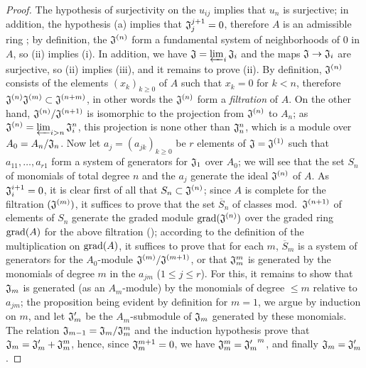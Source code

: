 \begin{proof}
\label{proof-0.7.2.7}
The hypothesis of surjectivity on the $u_{ij}$ implies that $u_n$ is surjective;
in addition, the hypothesis (a) implies that $\mathfrak{J}_j^{j+1}=0$, therefore
$A$ is an admissible ring ; by definition, the
$\mathfrak{J}^{(n)}$ form a fundamental system of neighborhoods of $0$ in $A$,
so (ii) implies (i). In addition, we have
$\mathfrak{J}=\varprojlim_i\mathfrak{J}_i$ and the maps
$\mathfrak{J}\to\mathfrak{J}_i$ are surjective, so (ii) implies (iii), and it
remains to prove (ii). By definition, $\mathfrak{J}^{(n)}$ consists of the
elements $(x_k)_{k\geqslant 0}$ of $A$ such that $x_k=0$ for $k<n$, therefore
$\mathfrak{J}^{(n)}\mathfrak{J}^{(m)}\subset\mathfrak{J}^{(n+m)}$, in other
words the $\mathfrak{J}^{(n)}$ form a {\em filtration} of $A$. On the other
hand, $\mathfrak{J}^{(n)}/\mathfrak{J}^{(n+1)}$ is isomorphic to the projection
from $\mathfrak{J}^{(n)}$ to $A_n$; as
$\mathfrak{J}^{(n)}=\varprojlim_{i>n}\mathfrak{J}_i^n$, this projection is none
other than $\mathfrak{J}_n^n$, which is a module over $A_0=A_n/\mathfrak{J}_n$.
Now let $a_j=(a_{jk})_{k\geqslant 0}$ be $r$ elements of
$\mathfrak{J}=\mathfrak{J}^{(1)}$ such that $a_{11},\dots,a_{r1}$ form a system
of generators for $\mathfrak{J}_1$ over $A_0$; we will see that the set $S_n$ of
monomials of total degree $n$ and the $a_j$ generate the ideal
$\mathfrak{J}^{(n)}$ of $A$. As $\mathfrak{J}_i^{i+1}=0$, it is clear first of
all that $S_n\subset\mathfrak{J}^{(n)}$; since $A$ is complete for the
filtration $(\mathfrak{J}^{(m)})$, it suffices to prove that the set
$\overline{S}_n$ of classes mod.~$\mathfrak{J}^{(n+1)}$ of elements of $S_n$
generate the graded module ${\mathop{\mathrm{grad}}\nolimits}(\mathfrak{J}^{(n)})$ over the graded ring
${\mathop{\mathrm{grad}}\nolimits}(A)$ for the above filtration (\cite[p.~18--06, lemme]{I-1}); according to
the definition of the multiplication on ${\mathop{\mathrm{grad}}\nolimits}(A)$,
it suffices to prove that for each $m$, $\overline{S}_m$ is a system of
generators for the $A_0$-module $\mathfrak{J}^{(m)}/\mathfrak{J}^{(m+1)}$, or
that $\mathfrak{J}_m^m$ is generated by the monomials of degree $m$ in the
$a_{jm}$ ($1\leqslant j\leqslant r$). For this, it remains to show that
$\mathfrak{J}_m$ is generated (as an $A_m$-module) by the monomials of degree
$\leqslant m$ relative to $a_{jm}$; the proposition being evident by definition
for $m=1$, we argue by induction on $m$, and let $\mathfrak{J}_m'$ be the
$A_m$-submodule of $\mathfrak{J}_m$ generated by these monomials. The relation
$\mathfrak{J}_{m-1}=\mathfrak{J}_m/\mathfrak{J}_m^m$ and the induction
hypothesis prove that $\mathfrak{J}_m=\mathfrak{J}_m'+\mathfrak{J}_m^m$, hence,
since $\mathfrak{J}_m^{m+1}=0$, we have $\mathfrak{J}_m^m={\mathfrak{J}_m'}^m$,
and finally $\mathfrak{J}_m=\mathfrak{J}_m'$.
\end{proof}

